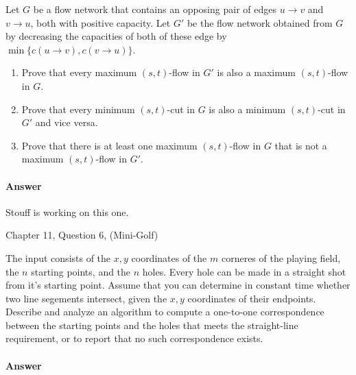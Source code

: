 \documentclass{article}
\begin{document}
Let $G$ be a flow network that contains an opposing pair of edges $u \to v$ and $v \to u$, both with positive capacity.
Let $G'$ be the flow network obtained from $G$ by decreasing the capacities of both of these edge by $\min \{ c(u \to v), c(v \to u) \}$.

\begin{enumerate}[label=(\alph*)]
    \item Prove that every maximum $(s,t)$-flow in $G'$ is also a maximum $(s,t)$-flow in $G$.
    \item Prove that every minimum $(s,t)$-cut in $G$ is also a minimum $(s,t)$-cut in $G'$ and vice versa.
    \item Prove that there is at least one maximum $(s,t)$-flow in $G$ that is not a maximum $(s,t)$-flow in $G'$.
\end{enumerate}

\paragraph{Answer}


Stouff is working on this one.


\nextprob
{}

Chapter 11, Question 6, (Mini-Golf)

The input consists of the $x,y$ coordinates of the $m$ corneres of the playing field, the $n$ starting points, and the $n$ holes.
Every hole can be made in a straight shot from it's starting point.
Assume that you can determine in constant time whether two line segements intersect, given the $x,y$ coordinates of their endpoints.
Describe and analyze an algorithm to compute a one-to-one correspondence between the starting points and the holes that meets the straight-line requirement, or to report that no such correspondence exists.

\paragraph{Answer}

\end{document}
